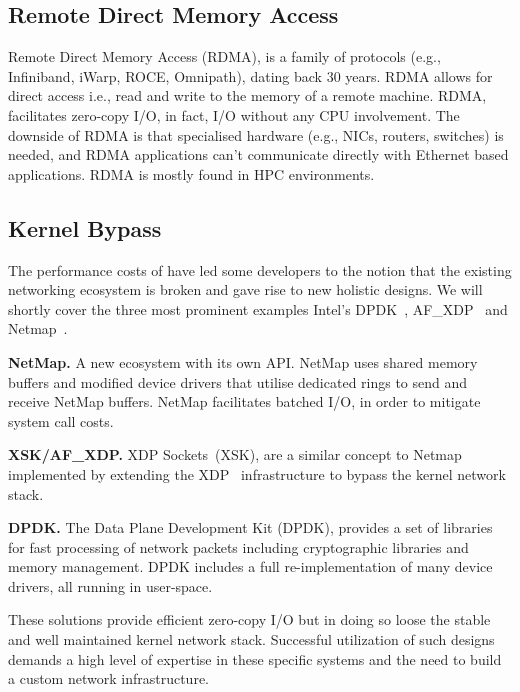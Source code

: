 \subsection{Remote Direct Memory Access}
Remote Direct Memory Access (RDMA), is a family of protocols (e.g., Infiniband\cite{infiniband}, iWarp\cite{iwarp}, ROCE\cite{roce}, Omnipath\cite{omnipath}), dating back 30 years. RDMA allows for direct access i.e., read and write to the memory of a remote machine. RDMA, facilitates zero-copy I/O, in fact, I/O without any CPU involvement. The downside of RDMA is that specialised hardware (e.g., NICs, routers, switches) is needed, and RDMA applications can't communicate directly with Ethernet based applications. RDMA is mostly found in HPC environments\cite{top500}.

\subsection{Kernel Bypass}
The performance costs of \sockets have led some developers to the notion that the existing networking ecosystem is broken and gave rise to new holistic designs. We will shortly cover the three most prominent examples Intel's DPDK~\cite{dpdk}, AF\_XDP~\cite{xsk} and Netmap~\cite{rizzo2012netmap}.


\noindent\textbf{NetMap.} A new ecosystem with its own API. NetMap\cite{rizzo2012netmap} uses shared memory buffers and modified device drivers that utilise dedicated rings to send and receive NetMap buffers. NetMap facilitates batched I/O, in order to mitigate system call costs.

\noindent \textbf{XSK/AF\_XDP.} XDP Sockets~(XSK), are a similar concept to Netmap implemented by  extending the XDP~\cite{xdp} infrastructure to bypass the kernel network stack.

\noindent \textbf{DPDK.}
The Data Plane Development Kit (DPDK)\cite{dpdk}, provides a  set of libraries for fast processing of network packets including cryptographic libraries and memory management. DPDK includes a full re-implementation of many device drivers, all running in user-space.

These solutions provide efficient zero-copy I/O but in doing so loose the stable and well maintained kernel network stack. Successful utilization of such designs demands a high level of expertise in these specific systems and the need to build a custom network infrastructure.


